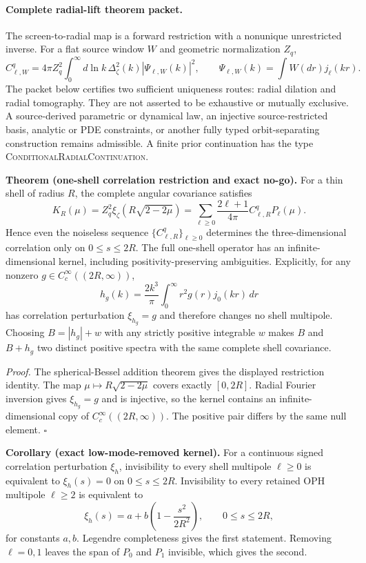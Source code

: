 
\paragraph{Complete radial-lift theorem packet.}
\label{par:oph330-complete-radial-lift}
The screen-to-radial map is a forward restriction with a nonunique unrestricted inverse.
For a flat source window $W$ and geometric normalization $Z_q$,
\[
 C_{\ell,W}^q
 =4\pi Z_q^2\int_0^\infty d\ln k\,
 \Delta_\zeta^2(k)|\Psi_{\ell,W}(k)|^2,
 \qquad
 \Psi_{\ell,W}(k)=\int W(dr)j_\ell(kr).
\]
The packet below certifies two sufficient uniqueness routes: radial dilation
and radial tomography. They are not asserted to be exhaustive or mutually
exclusive. A source-derived parametric or dynamical law, an injective
source-restricted basis, analytic or PDE constraints, or another fully typed
orbit-separating construction remains admissible. A finite prior continuation
has the type \textsc{ConditionalRadialContinuation}.

\textbf{Theorem (one-shell correlation restriction and exact no-go).}
\label{thm:oph330-shell-correlation-restriction}
For a thin shell of radius $R$, the complete angular covariance satisfies
\[
 K_R(\mu)
 =Z_q^2\xi_\zeta\!\left(R\sqrt{2-2\mu}\right)
 =\sum_{\ell\ge0}\frac{2\ell+1}{4\pi}C_{\ell,R}^qP_\ell(\mu).
\]
Hence even the noiseless sequence $\{C_{\ell,R}^q\}_{\ell\ge0}$ determines the
three-dimensional correlation only on $0\le s\le2R$.  The full one-shell
operator has an infinite-dimensional kernel, including positivity-preserving
ambiguities.  Explicitly, for any nonzero
$g\in C_c^\infty((2R,\infty))$,
\[
 h_g(k)=\frac{2k^3}{\pi}\int_0^\infty r^2g(r)j_0(kr)\,dr
\]
has correlation perturbation $\xi_{h_g}=g$ and therefore changes no shell
multipole.  Choosing $B=|h_g|+w$ with any strictly positive integrable $w$ makes
$B$ and $B+h_g$ two distinct positive spectra with the same complete shell
covariance.

\textit{Proof.}
The spherical-Bessel addition theorem gives the displayed restriction identity.
The map $\mu\mapsto R\sqrt{2-2\mu}$ covers exactly $[0,2R]$.  Radial Fourier
inversion gives $\xi_{h_g}=g$ and is injective, so the kernel contains an
infinite-dimensional copy of $C_c^\infty((2R,\infty))$.  The positive pair differs
by the same null element.  \hfill$\square$

\textbf{Corollary (exact low-mode-removed kernel).}
\label{cor:oph330-low-mode-shell-kernel}
For a continuous signed correlation perturbation \(\xi_h\), invisibility to
every shell multipole \(\ell\ge0\) is equivalent to
\(\xi_h(s)=0\) on \(0\le s\le2R\). Invisibility to every retained OPH
multipole \(\ell\ge2\) is equivalent to
\[
\xi_h(s)=a+b\left(1-\frac{s^2}{2R^2}\right),
\qquad 0\le s\le2R,
\]
for constants \(a,b\). Legendre completeness gives the first statement.
Removing \(\ell=0,1\) leaves the span of \(P_0\) and \(P_1\) invisible, which
gives the second.


